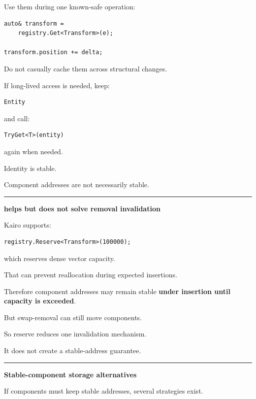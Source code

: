 Use them during one known-safe operation:

\begin{verbatim}
auto& transform =
    registry.Get<Transform>(e);

transform.position += delta;
\end{verbatim}

Do not casually cache them across structural changes.

If long-lived access is needed, keep:

\begin{verbatim}
Entity
\end{verbatim}

and call:

\begin{verbatim}
TryGet<T>(entity)
\end{verbatim}

again when needed.

Identity is stable.

Component addresses are not necessarily stable.

\begin{center}\rule{0.5\linewidth}{0.5pt}\end{center}

\textbf{ helps but does not solve removal invalidation}

Kairo supports:

\begin{verbatim}
registry.Reserve<Transform>(100000);
\end{verbatim}

which reserves dense vector capacity.

That can prevent reallocation during expected insertions.

Therefore component addresses may remain stable \textbf{under insertion until capacity is exceeded}.

But swap-removal can still move components.

So reserve reduces one invalidation mechanism.

It does not create a stable-address guarantee.

\begin{center}\rule{0.5\linewidth}{0.5pt}\end{center}

\textbf{Stable-component storage alternatives}

If components must keep stable addresses, several strategies exist.

